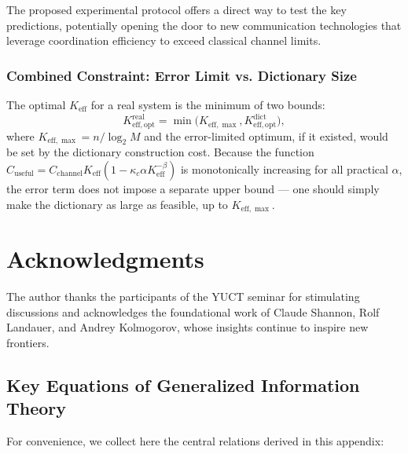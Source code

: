 \documentclass[12pt,a4paper]{article}
\theoremstyle{remark}
\newcommand{\Keff}{K_{\mathrm{eff}}}
\newcommand{\Keffopt}{K_{\mathrm{eff},\mathrm{opt}}}
\newcommand{\Keffmax}{K_{\mathrm{eff},\max}}
\begin{document}
	The proposed experimental protocol offers a direct way to test the key predictions, potentially opening the door to new communication technologies that leverage coordination efficiency to exceed classical channel limits.
	
	\subsubsection{Combined Constraint: Error Limit vs. Dictionary Size}
	The optimal $\Keff$ for a real system is the minimum of two bounds:
	\[
	\Keffopt^{\text{real}} = \min\bigl( \Keffmax, \Keffopt^{\text{dict}} \bigr),
	\]
	where $\Keffmax = n / \log_2 M$ and the error-limited optimum, if it existed, would be set by the dictionary construction cost. Because the function $C_{\text{useful}} = C_{\text{channel}} \Keff (1 - \kappa_c\alpha K_{\mathrm{eff}}^{-\beta})$ is monotonically increasing for all practical $\alpha$, the error term does not impose a separate upper bound --- one should simply make the dictionary as large as feasible, up to $\Keffmax$.
	
	\section*{Acknowledgments}
	
	The author thanks the participants of the YUCT seminar for stimulating discussions and acknowledges the foundational work of Claude Shannon, Rolf Landauer, and Andrey Kolmogorov, whose insights continue to inspire new frontiers.
	
	\subsection*{Key Equations of Generalized Information Theory}
	For convenience, we collect here the central relations derived in this appendix:
	
\end{document}
